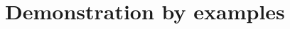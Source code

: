 \section{Demonstration by examples}
\label{section:evaluation}


\begin{table}[b]
	\centering
	\renewcommand{\arraystretch}{1.3}
	\begin{tabularx}{\textwidth}{|Y|Y|Y|Y|}
		\hline


\end{tabularx}
\end{table}
